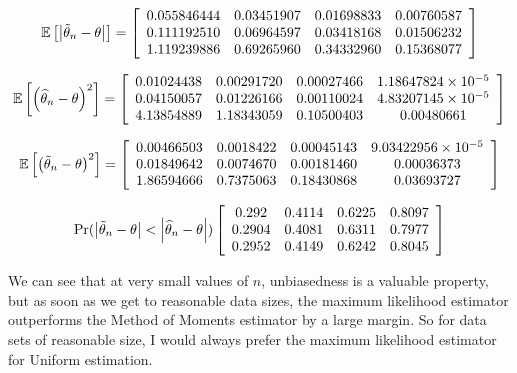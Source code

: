 \documentclass[12pt]{paper}
\begin{document}
\begin{equation}
  \mathbb{E} \left [  \left \lvert  \tilde{ \theta }_{n} - \theta \right \rvert \right ] = 
\left[
\begin{array}{cccc}
0.055846444 & 0.03451907 & 0.01698833 & 0.00760587\\ 
0.111192510 & 0.06964597 & 0.03418168 & 0.01506232\\ 
1.119239886 & 0.69265960 & 0.34332960 & 0.15368077\\ 
\end{array}
\right]
\end{equation}


\begin{equation}
  \mathbb{E} \left [  \left( \widehat{ \theta }_{n} - \theta \right)^2 \right ] = 
\left[
\begin{array}{cccc}
0.01024438 & 0.00291720 & 0.00027466 & 1.18647824 \times 10^{-5} \\ 
0.04150057 & 0.01226166 & 0.00110024 & 4.83207145 \times 10^{-5} \\ 
4.13854889 & 1.18343059 & 0.10500403 & 0.00480661 \\ 
\end{array}
\right]
\end{equation}


\begin{equation}
  \mathbb{E} \left [  \left( \tilde{ \theta }_{n} - \theta \right)^2 \right ] = 
\left[
\begin{array}{cccc}
0.00466503 & 0.0018422 & 0.00045143 & 9.03422956 \times 10^{-5} \\ 
0.01849642 & 0.0074670 & 0.00181460 & 0.00036373 \\ 
1.86594666 & 0.7375063 & 0.18430868 & 0.03693727 \\ 
\end{array}
\right]
\end{equation}


\begin{equation}
  \Pr( \left \lvert  \tilde{ \theta }_{n} - \theta \right \rvert < \left \lvert  \widehat{ \theta }_{n} - \theta \right \rvert )
\left[
\begin{array}{cccc}
0.292 & 0.4114 & 0.6225 & 0.8097 \\ 
0.2904 & 0.4081 & 0.6311 & 0.7977 \\ 
0.2952 & 0.4149 & 0.6242 & 0.8045 \\ 
\end{array}
\right]
\end{equation}

We can see that at very small values of $n$, unbiasedness is a
valuable property, but as soon as we get to reasonable data sizes, the
maximum likelihood estimator outperforms the Method of Moments
estimator by a large margin. So for data sets of reasonable size, I
would always prefer the maximum likelihood estimator for Uniform
estimation.
\end{document}
